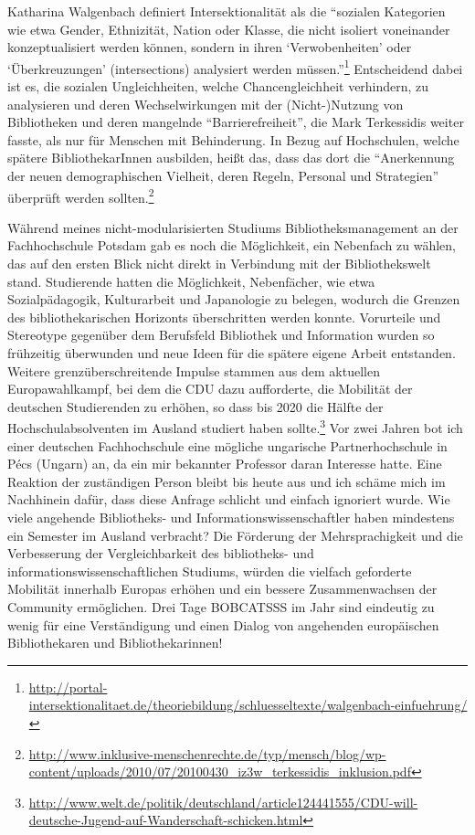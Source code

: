 \documentclass[a4paper,
fontsize=11pt,
oneside,
numbers=noperiodatend,
parskip=half-,
bibliography=totoc,
final
]{scrartcl}
\begin{document}
Katharina Walgenbach definiert Intersektionalität als die
\enquote{sozialen Kategorien wie etwa Gender, Ethnizität, Nation oder
Klasse, die nicht isoliert voneinander konzeptualisiert werden können,
sondern in ihren \enquote{Verwobenheiten} oder \enquote{Überkreuzungen}
(intersections) analysiert werden müs\-sen.}\footnote{\url{http://portal-intersektionalitaet.de/theoriebildung/schluesseltexte/walgenbach-einfuehrung/}}
Entscheidend dabei ist es, die sozialen Ungleichheiten, welche
Chancengleichheit verhindern, zu analysieren und deren Wechselwirkungen
mit der (Nicht-)Nutzung von Bibliotheken und deren mangelnde
\enquote{Barrierefreiheit}, die Mark Terkessidis weiter fasste, als nur
für Menschen mit Behinderung. In Bezug auf Hochschulen, welche spätere
BibliothekarInnen ausbilden, heißt das, dass das dort die
\enquote{Anerkennung der neuen demographischen Vielheit, deren Regeln,
Personal und Strategien} überprüft werden sollten.\footnote{\url{http://www.inklusive-menschenrechte.de/typ/mensch/blog/wp-content/uploads/2010/07/20100430\_iz3w\_terkessidis\_inklusion.pdf}}

Während meines nicht-modularisierten Studiums Bibliotheksmanagement an
der Fachhochschule Potsdam gab es noch die Möglichkeit, ein Nebenfach zu
wählen, das auf den ersten Blick nicht direkt in Verbindung mit der
Bibliothekswelt stand. Studierende hatten die Möglichkeit, Nebenfächer,
wie etwa Sozialpädagogik, Kulturarbeit und Japanologie zu belegen,
wodurch die Grenzen des bibliothekarischen Horizonts überschritten
werden konnte. Vorurteile und Stereotype gegenüber dem Berufsfeld
Bibliothek und Information wurden so frühzeitig überwunden und neue
Ideen für die spätere eigene Arbeit entstanden. Weitere
grenzüberschreitende Impulse stammen aus dem aktuellen Europawahlkampf,
bei dem die CDU dazu aufforderte, die Mobilität der deutschen
Studierenden zu erhöhen, so dass bis 2020 die Hälfte der
Hochschulabsolventen im Ausland studiert haben sollte.\footnote{\url{http://www.welt.de/politik/deutschland/article124441555/CDU-will-deutsche-Jugend-auf-Wanderschaft-schicken.html}}
Vor zwei Jahren bot ich einer deutschen Fachhochschule eine mögliche
ungarische Partnerhochschule in Pécs (Ungarn) an, da ein mir bekannter
Professor daran Interesse hatte. Eine Reaktion der zuständigen Person
bleibt bis heute aus und ich schäme mich im Nachhinein dafür, dass diese
Anfrage schlicht und einfach ignoriert wurde. Wie viele angehende
Bibliotheks- und Informationswissenschaftler haben mindestens ein
Semester im Ausland verbracht? Die Förderung der Mehrsprachigkeit und
die Verbesserung der Vergleichbarkeit des bibliotheks- und
informationswissenschaftlichen Studiums, würden die vielfach geforderte
Mobilität innerhalb Europas erhöhen und ein bessere Zusammenwachsen der
Community ermöglichen. Drei Tage BOBCATSSS im Jahr sind eindeutig zu
wenig für eine Verständigung und einen Dialog von angehenden
europäischen Bibliothekaren und Bibliothekarinnen!
\end{document}
